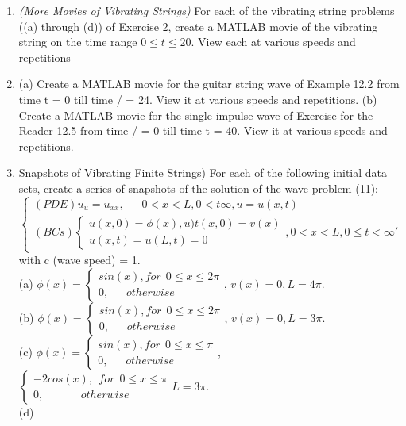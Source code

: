 \documentclass[../main.tex]{subfiles}
\begin{document}
{{\begin{enumerate}
{View each at various speeds and repetitions. }
	\item 
		{\textit{(More Movies of Vibrating Strings)} For each of the vibrating string problems ((a) through (d)) 
of Exercise 2, create a MATLAB movie of the vibrating string on the time range $0 \leqslant t \leqslant 20$. 
View each at various speeds and repetitions}
	\item
		(a) Create a MATLAB movie for the guitar string wave of Example 12.2 from time t = 0 till 
time / = 24. View it at various speeds and repetitions. 
(b) Create a MATLAB movie for the single impulse wave of Exercise for the Reader 12.5 from 
time / = 0 till time t = 40. View it at various speeds and repetitions. 
	\item
	{Snapshots of Vibrating Finite Strings) For each of the following initial data sets, create a series 
of snapshots of the solution of the wave problem (11):\\
$$\begin{cases} 
	(PDE) u_u=u_{xx}, ~~~~~~~ 0< x< L, 0<t \infty , u=u(x,t) \\ 
	(BCs) 
\begin{cases}
	u(x,0)=\phi(x) , u)t(x,0)=v(x)\\
	u(x,t)=u(L,t)=0
\end{cases}, 
	0<x<L, 0\leqslant t< \infty '
\end{cases}$$}
with c (wave speed) = 1. 
\\
(a)
$\phi(x)=
\begin{cases} 
	sin(x), for~~ 0\leqslant  x\leqslant 2 \pi \\
	0, ~~~~~~~otherwise
\end{cases}$, 
	$v(x)=0 , L=4 \pi$.
\\
(b)
$\phi(x)=
\begin{cases} 
	sin(x), for~~ 0\leqslant  x\leqslant 2 \pi \\
	0, ~~~~~~~otherwise
\end{cases}$, 
	$v(x)=0 , L=3 \pi$.
\\
(c)
$\phi(x)=
\begin{cases} 
	sin(x), for~~ 0\leqslant  x\leqslant  \pi \\
	0, ~~~~~~~otherwise
\end{cases}$, 
	$\begin{cases} 
		-2cos(x), ~~for~~ 0 \leqslant x \leqslant \pi \\	
		0, ~~~~~~~~~~~~~~~otherwise
	\end{cases}
		L=3 \pi$.
\\
(d)

\end{enumerate}}}
\end{document}
